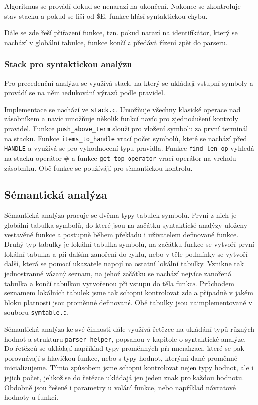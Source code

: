 \documentclass[11pt]{article}
\begin{document}
Algoritmus se provádí dokud se nenarazí na ukončení. Nakonec se zkontroluje stav stacku a pokud se liší od \$E,
funkce hlásí syntaktickou chybu.

Dále se zde řeší přiřazení funkce, tzn. pokud narazí na identifikátor, který se nachází v globální tabulce,
funkce končí a předává řízení zpět do parseru.

\subsubsection{Stack pro syntaktickou analýzu}
Pro precedenční analýzu se využívá stack, na který se ukládají vstupní symboly a provádí se na něm redukování
výrazů podle pravidel.

Implementace se nachází ve \texttt{stack.c}. Umožňuje všechny klasické operace nad zásobníkem a navíc
umožňuje několik funkcí navíc pro zjednodušení kontroly pravidel. Funkce \texttt{push\_above\_term} slouží pro
vložení symbolu za první terminál na stacku. Funkce \texttt{items\_to\_handle} vrací počet symbolů,
které se nachází před \texttt{HANDLE} a využívá se pro vyhodnocení typu pravidla.
Funkce \texttt{find\_len\_op} vyhledá na stacku operátor \# a funkce \texttt{get\_top\_operator} vrací operátor
na vrcholu zásobníku. Obě funkce se používájí pro sémantickou kontrolu.

\subsection{Sémantická analýza}
 Sémantická analýza pracuje se dvěma typy tabulek symbolů. První z nich je globální tabulka symbolů, do které jsou na začátku
 syntaktické analýzy uloženy vestavěné funkce a postupně během překladu i uživatelem definované funkce. Druhý typ tabulky je lokální
 tabulka symbolů, na začátku funkce se vytvoří první lokální tabulka a při dalším zanoření do cyklu, nebo v těle podmínky se vytvoří
 další, která se pomocí ukazatele napojí na ostatní lokální tabulky. Vznikne tak jednostranně vázaný seznam, na jehož začátku se nachází
 nejvíce zanořená tabulka a končí tabulkou vytvořenou při vstupu do těla funkce. Průchodem seznamem lokálních tabulek jsme tak
 schopni kontrolovat zda a případně v jakém bloku platnosti jsou proměnné definované. Obě tabulky jsou naimplementované v souboru
 \texttt{symtable.c}.

Sémantická analýza ke své činnosti dále využívá řetězce na ukládání typů různých hodnot a strukturu \texttt{parser\_helper}, popsanou v kapitole o syntaktické analýze.
Do řetězců se ukládají například typy proměnných při inicializaci, které se pak porovnávají s hlavičkou funkce, nebo s typy hodnot,
kterými dané proměnné inicializujeme. Tímto způsobem jsme schopni kontrolovat nejen typy hodnot, ale i jejich počet, jelikož se do řetězce ukládajá
jen jeden znak pro každou hodnotu. Obdobně jsou řešené i parametry u volání funkce, nebo například návratové hodnoty u funkcí.
\end{document}
